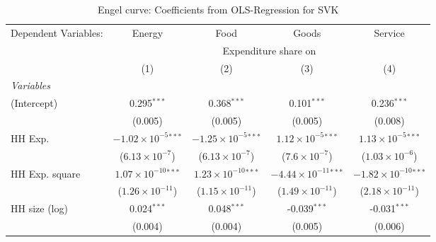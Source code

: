 
\begin{table}[htbp!]
   \centering
   \small
   \begin{adjustbox}{width = 1\textwidth, max height = 0.95\textheight, center}
      \begin{threeparttable}[b]
         \caption{\label{tab:Engel_parametric_SVK} Engel curve: Coefficients from OLS-Regression for SVK}
         \begin{tabular}{lcccc}
            \tabularnewline \midrule \midrule
            Dependent Variables: & Energy                         & Food                           & Goods                           & Service\\  
             & \multicolumn{4}{c}{Expenditure share on} \\ 
                                 & (1)                            & (2)                            & (3)                             & (4)\\  
            \midrule
            \emph{Variables}\\
            (Intercept)          & 0.295$^{***}$                  & 0.368$^{***}$                  & 0.101$^{***}$                   & 0.236$^{***}$\\   
                                 & (0.005)                        & (0.005)                        & (0.005)                         & (0.008)\\   
            HH Exp.              & $-1.02\times 10^{-5}$$^{***}$  & $-1.25\times 10^{-5}$$^{***}$  & $1.12\times 10^{-5}$$^{***}$    & $1.13\times 10^{-5}$$^{***}$\\    
                                 & ($6.13\times 10^{-7}$)         & ($6.13\times 10^{-7}$)         & ($7.6\times 10^{-7}$)           & ($1.03\times 10^{-6}$)\\    
            HH Exp. square       & $1.07\times 10^{-10}$$^{***}$  & $1.23\times 10^{-10}$$^{***}$  & $-4.44\times 10^{-11}$$^{***}$  & $-1.82\times 10^{-10}$$^{***}$\\    
                                 & ($1.26\times 10^{-11}$)        & ($1.15\times 10^{-11}$)        & ($1.49\times 10^{-11}$)         & ($2.18\times 10^{-11}$)\\    
            HH size (log)        & 0.024$^{***}$                  & 0.048$^{***}$                  & -0.039$^{***}$                  & -0.031$^{***}$\\   
                                 & (0.004)                        & (0.004)                        & (0.005)                         & (0.006)\\   

\end{tabular}
\end{threeparttable}
\end{adjustbox}
\end{table}
